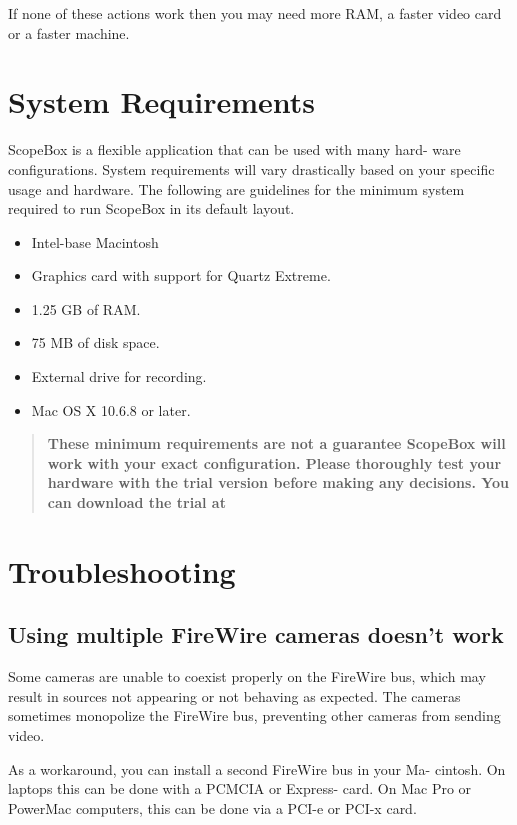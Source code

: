 \documentclass[10,letterpaper,]{report}
\begin{document}
If none of these actions work then you may need more RAM, a faster video
card or a faster machine.

\chapter{System Requirements}

ScopeBox is a flexible application that can be used with many hard- ware
configurations. System requirements will vary drastically based on your
specific usage and hardware. The following are guidelines for the
minimum system required to run ScopeBox in its default layout.

\begin{itemize}
\itemsep1pt\parskip0pt
\item
  Intel-base Macintosh
\item
  Graphics card with support for Quartz Extreme.
\item
  1.25 GB of RAM.
\item
  75 MB of disk space.
\item
  External drive for recording.
\item
  Mac OS X 10.6.8 or later.
\end{itemize}

\begin{quote}
\textbf{These minimum requirements are not a guarantee ScopeBox will
work with your exact configuration. Please thoroughly test your hardware
with the trial version before making any decisions. You can download the
trial at }
\end{quote}

\chapter{Troubleshooting}

\section{Using multiple FireWire cameras doesn't work}

Some cameras are unable to coexist properly on the FireWire bus, which
may result in sources not appearing or not behaving as expected. The
cameras sometimes monopolize the FireWire bus, preventing other cameras
from sending video.

As a workaround, you can install a second FireWire bus in your Ma-
cintosh. On laptops this can be done with a PCMCIA or Express- card. On
Mac Pro or PowerMac computers, this can be done via a PCI-e or PCI-x
card.
\end{document}
